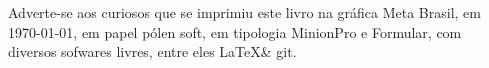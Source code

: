 \pagebreak


\parindent=0pt
\footnotesize\thispagestyle{empty}








\mbox{}\vfill


\begin{center}
		\begin{minipage}{.75\textwidth}\tiny\noindent{}
		\centering\tiny
		Adverte-se aos curiosos que se imprimiu este 
		livro na gráfica Meta Brasil, 
		em \today, em papel pólen soft, em tipologia MinionPro e Formular, 
		com diversos sofwares livres, 
		entre eles \LaTeX \& git. \medskip\\\
		\end{minipage}
\end{center}